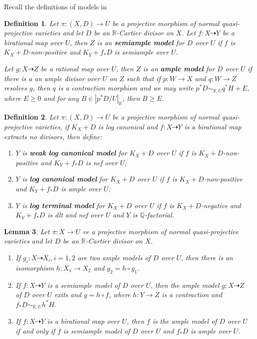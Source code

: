 \documentclass{article}
\newtheorem{defn}{Definition}[subsection]
\newtheorem{lem}[defn]{Lemma}
\begin{document}
Recall the definitions of models in \cite{birkarExistenceMinimalModels2009}
\begin{defn}
  \cite[Definition 3.6.5]{birkarExistenceMinimalModels2009} Let $ \pi:(X,D)\to U $ be a projective morphism of normal quasi-projective varieties and let $D$ be an $\mathbb{R}$-Cartier divisor on $X$. Let $ f:X\dashrightarrow Y $ be a birational map over $ U $, then $ Z $ is an \textbf{semiample model } for $ D $ over $ U $ if $ f $ is $ K_X+D $-non-positive and $ K_Y+f_*D $ is semiample over $ U $.

  Let $ g:X\dashrightarrow Z $ be a rational map over $ U $, then $ Z $ is an \textbf{ample model } for $ D $ over $ U $ if there is a an ample divisor over $U$  on $Z$  such that if $p:W \to X $ and $q:W \to Z $ resolves $g$, then $q$ is a contraction morphism and we may write $p^*D \sim_{\mathbb{R},U} q^*H+E$, where $E\geqslant 0$ and for any $B \in |p^*D/U|_{\mathbb{R}}$, then $B\geqslant E$.
\end{defn}
\begin{defn}\label{models}
  \cite[Definition 3.6.7]{birkarExistenceMinimalModels2009} Let $ \pi:(X,D)\to U $ be a projective morphism of normal quasi-projective varieties, if $ K_X+D $ is log canonical and $ f:X\dashrightarrow Y $ is a birational map extracts no divisors, then define:
  \begin{enumerate}
    \item $ Y $ is \textbf{weak log canonical model} for $ K_X+D $ over $ U $ if $ f $ is $ K_X+D $-non-positive and $ K_Y+f_*D $ is nef over $ U $;
    \item $ Y $ is \textbf{ log canonical model} for $ K_X+D $ over $ U $ if $ f $ is $ K_X+D $-non-positive and $ K_Y+f_*D $ is ample over $ U $;
    \item $ Y $ is \textbf{ log terminal model} for $ K_X+D $ over $ U $ if $ f $ is $ K_X+D $-negative and $ K_Y+f_*D $ is dlt and nef over $ U $ and $ Y $ is $ \mathbb{Q} $-factorial.
  \end{enumerate}
\end{defn}
\begin{lem}\cite[Lemma 3.6.6]{birkarExistenceMinimalModels2009}
  Let $\pi:X \to U$ ve a projective morphism of normal quasi-projective varieties and let $D$ be an $\mathbb{R}$-Cartier divisor on $X$.
  \begin{enumerate}
    \item If $g_{i}:X \dashrightarrow X_{i},i=1,2$ are two ample models of $D$ over $U$, then there is an isomorphism $h:X_{1}\to X_{2}$ and $g_{2}=h \circ g_{1}$.
    \item If $f:X \dashrightarrow Y$ is a semiample model of $D$ over $U$, then the ample model $g:X \dashrightarrow  Z$ of $D$ over $U$   exits and $g=h \circ f$, where $h:Y \to Z$ is a contraction and $f_*D \sim_{\mathbb{R},U}h^*H$.
  \item  If $f:X \dashrightarrow Y$ is a birational map over $U$, then $f$ is the ample model of $D$ over $U$ if and only if $f$ is semiample model of $D$ over $U$ and $f_*D$ is ample over $U$.     
  \end{enumerate}
\end{lem}
\end{document}
